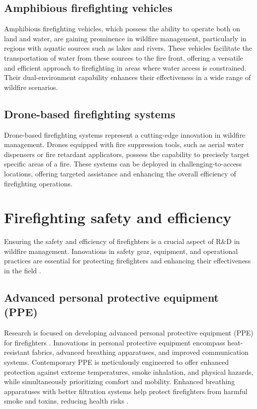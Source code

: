 \documentclass[
  12 pt,
]{Nemilov}
\begin{document}
\subsection{Amphibious firefighting vehicles}\label{amphibious-firefighting-vehicles}

Amphibious firefighting vehicles, which possess the ability to operate both on land and water, are gaining prominence in wildfire management, particularly in regions with aquatic sources such as lakes and rivers. These vehicles facilitate the transportation of water from these sources to the fire front, offering a versatile and efficient approach to firefighting in areas where water access is constrained. Their dual-environment capability enhances their effectiveness in a wide range of wildfire scenarios.

\subsection{Drone-based firefighting systems}\label{drone-based-firefighting-systems}

Drone-based firefighting systems represent a cutting-edge innovation in wildfire management. Drones equipped with fire suppression tools, such as aerial water dispensers or fire retardant applicators, possess the capability to precisely target specific areas of a fire. These systems can be deployed in challenging-to-access locations, offering targeted assistance and enhancing the overall efficiency of firefighting operations.

\section{Firefighting safety and efficiency}\label{firefighting-safety-and-efficiency}

Ensuring the safety and efficiency of firefighters is a crucial aspect of R\&D in wildfire management. Innovations in safety gear, equipment, and operational practices are essential for protecting firefighters and enhancing their effectiveness in the field \citep{koopmans2020exploring, navarro2022wildland}.

\subsection{Advanced personal protective equipment (PPE)}\label{advanced-personal-protective-equipment-ppe}

Research is focused on developing advanced personal protective equipment (PPE) for firefighters \citep{park2014assessment, santos2022firefighting}. Innovations in personal protective equipment encompass heat-resistant fabrics, advanced breathing apparatuses, and improved communication systems. Contemporary PPE is meticulously engineered to offer enhanced protection against extreme temperatures, smoke inhalation, and physical hazards, while simultaneously prioritizing comfort and mobility. Enhanced breathing apparatuses with better filtration systems help protect firefighters from harmful smoke and toxins, reducing health risks \citep{white2017effect}.
\end{document}
